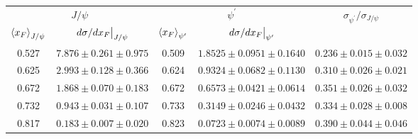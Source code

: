 \begin{tabular}{cc|cc|c}
\hline
\multicolumn{2}{c|}{$J/\psi$}                               & \multicolumn{2}{c|}{$\psi^{\prime}$}                                                    & \multirow{2}{*}{$\sigma_{\psi^\prime}/\sigma_{J/\psi}$} \\ \cline{1-4}
$\expval{x_F}_{J/\psi}$    & $\eval{d\sigma/dx_F}_{J/\psi}$ & $\expval{x_F}_{\psi^\prime}$ & $\eval{d\sigma/dx_F}_{\psi^\prime}$ &                                                         \\ \hline
\multicolumn{1}{c|}{0.527} & $7.876\pm0.261\pm0.975$        & \multicolumn{1}{c|}{0.509}                        & $1.8525\pm0.0951\pm0.1640$          & $0.236\pm0.015\pm0.032$                                 \\
\multicolumn{1}{c|}{0.625} & $2.993\pm0.128\pm0.366$        & \multicolumn{1}{c|}{0.624}                        & $0.9324\pm0.0682\pm0.1130$          & $0.310\pm0.026\pm0.021$                                 \\
\multicolumn{1}{c|}{0.672} & $1.868\pm0.070\pm0.183$        & \multicolumn{1}{c|}{0.672}                        & $0.6573\pm0.0421\pm0.0614$          & $0.351\pm0.026\pm0.032$                                 \\
\multicolumn{1}{c|}{0.732} & $0.943\pm0.031\pm0.107$        & \multicolumn{1}{c|}{0.733}                        & $0.3149\pm0.0246\pm0.0432$          & $0.334\pm0.028\pm0.008$                                 \\
\multicolumn{1}{c|}{0.817} & $0.183\pm0.007\pm0.020$        & \multicolumn{1}{c|}{0.823}                        & $0.0723\pm0.0074\pm0.0089$          & $0.390\pm0.044\pm0.046$                                 \\ \hline
\end{tabular}
